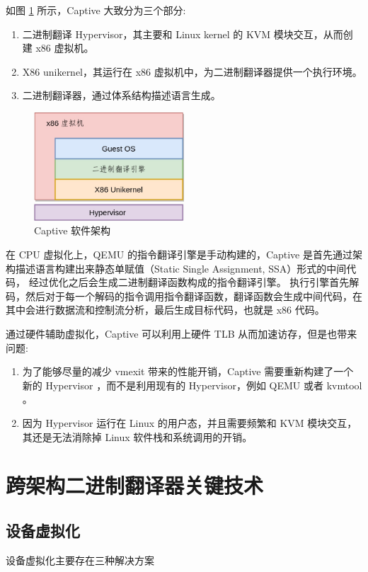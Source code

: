 如图 \ref{fig:captive} 所示，Captive 大致分为三个部分:
\begin{enumerate}
	\item 二进制翻译 Hypervisor，其主要和 Linux kernel 的 KVM 模块交互，从而创建 x86 虚拟机。
	\item X86 unikernel，其运行在 x86 虚拟机中，为二进制翻译器提供一个执行环境。
	\item 二进制翻译器，通过体系结构描述语言生成。
\end{enumerate}

\begin{figure}[!htbp]
	\centering
	\includegraphics[width=0.5\textwidth]{./images/captive.jpg}
	\caption{Captive 软件架构}
	\label{fig:captive}
\end{figure}

在 CPU 虚拟化上，QEMU 的指令翻译引擎是手动构建的，Captive 是首先通过架构描述语言构建出来静态单赋值（Static Single Assignment, SSA）形式的中间代码，
经过优化之后会生成二进制翻译函数构成的指令翻译引擎。
执行引擎首先解码，然后对于每一个解码的指令调用指令翻译函数，翻译函数会生成中间代码，在其中会进行数据流和控制流分析，最后生成目标代码，也就是 x86 代码。

通过硬件辅助虚拟化，Captive 可以利用上硬件 TLB 从而加速访存，但是也带来问题:
\begin{enumerate}
	\item 为了能够尽量的减少 vmexit 带来的性能开销，Captive 需要重新构建了一个新的 Hypervisor ，而不是利用现有的 Hypervisor，例如 QEMU 或者 kvmtool \citep{kvmtool}。
	\item 因为 Hypervisor 运行在 Linux 的用户态，并且需要频繁和 KVM 模块交互，其还是无法消除掉 Linux 软件栈和系统调用的开销。
\end{enumerate}

\section{跨架构二进制翻译器关键技术}

\subsection{设备虚拟化}
设备虚拟化主要存在三种解决方案

